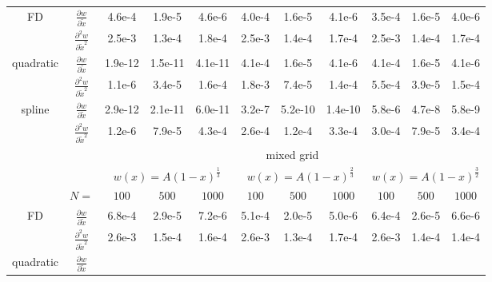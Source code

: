 \begin{tabular}{cc|c|c|c|c|c|c|c|c|c|}
\\ \cline{1-11}
\multicolumn{1}{|c|}{\multirow{2}{*}{FD}} &
\multicolumn{1}{|c|}{$\frac{\partial w}{\partial \tilde x}$}
  &4.6e-4  &1.9e-5  &4.6e-6  &4.0e-4  &1.6e-5  &4.1e-6  &3.5e-4  &1.6e-5  &4.0e-6
\\ \cline{2-11}
\multicolumn{1}{|c|}{}                        &
\multicolumn{1}{|c|}{$\frac{\partial^2 w}{\partial \tilde x^2}$}
  &2.5e-3  &1.3e-4  &1.8e-4  &2.5e-3  &1.4e-4  &1.7e-4  &2.5e-3  &1.4e-4  &1.7e-4
\\ \cline{1-11}
\multicolumn{1}{|c|}{\multirow{2}{*}{quadratic}} &
\multicolumn{1}{|c|}{$\frac{\partial w}{\partial \tilde x}$}
  &1.9e-12  &1.5e-11  &4.1e-11  &4.1e-4  &1.6e-5  &4.1e-6  &4.1e-4  &1.6e-5  &4.1e-6
\\ \cline{2-11}
\multicolumn{1}{|c|}{}                        &
\multicolumn{1}{|c|}{$\frac{\partial^2 w}{\partial \tilde x^2}$}
  &1.1e-6  &3.4e-5  &1.6e-4  &1.8e-3  &7.4e-5  &1.4e-4  &5.5e-4  &3.9e-5  &1.5e-4
\\ \cline{1-11}
\multicolumn{1}{|c|}{\multirow{2}{*}{spline}} &
\multicolumn{1}{|c|}{$\frac{\partial w}{\partial \tilde x}$}
  &2.9e-12  &2.1e-11  &6.0e-11  &3.2e-7  &5.2e-10  &1.4e-10  &5.8e-6  &4.7e-8  &5.8e-9
\\ \cline{2-11}
\multicolumn{1}{|c|}{}                        &
\multicolumn{1}{|c|}{$\frac{\partial^2 w}{\partial \tilde x^2}$}
  &1.2e-6  &7.9e-5  &4.3e-4  &2.6e-4  &1.2e-4  &3.3e-4  &3.0e-4  &7.9e-5  &3.4e-4
\\ \cline{1-11}
& & \multicolumn{9}{|c|}{mixed grid}
\\ \cline{3-11}
& & \multicolumn{3}{|c|}{$w(x)=A(1-x)^\frac{1}{3}$} &  \multicolumn{3}{|c|}{$w(x)=A(1-x)^\frac{2}{3}$} &  \multicolumn{3}{|c|}{$w(x)=A(1-x)^\frac{3}{2}$}
\\ \cline{2-11}
& \multicolumn{1}{|c|}{$N=$} & $100$ & $500$ & $1000$ & $100$ & $500$ & $1000$ & $100$ & $500$ & $1000$
\\ \cline{1-11}
\multicolumn{1}{|c|}{\multirow{2}{*}{FD}} &
\multicolumn{1}{|c|}{$\frac{\partial w}{\partial \tilde x}$}
  &6.8e-4  &2.9e-5  &7.2e-6  &5.1e-4  &2.0e-5  &5.0e-6  &6.4e-4  &2.6e-5  &6.6e-6
\\ \cline{2-11}
\multicolumn{1}{|c|}{}                        &
\multicolumn{1}{|c|}{$\frac{\partial^2 w}{\partial \tilde x^2}$}
  &2.6e-3  &1.5e-4  &1.6e-4  &2.6e-3  &1.3e-4  &1.7e-4  &2.6e-3  &1.4e-4  &1.4e-4
\\ \cline{1-11}
\multicolumn{1}{|c|}{\multirow{2}{*}{quadratic}} &
\multicolumn{1}{|c|}{$\frac{\partial w}{\partial \tilde x}$}

\end{tabular}
